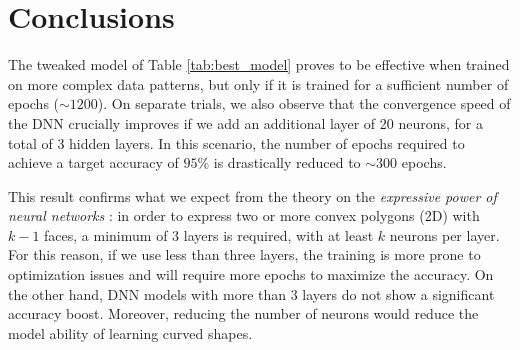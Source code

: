 \section{Conclusions}

The tweaked model of Table \ref{tab:best_model} proves to be effective when trained on more complex data patterns, but only if it is trained for a sufficient number of epochs ($\sim 1200$). On separate trials, we also observe that the convergence speed of the DNN crucially improves if we add an additional layer of 20 neurons, for a total of 3 hidden layers. In this scenario, the number of epochs required to achieve a target accuracy of $95\%$ is drastically reduced to $\sim 300$ epochs.

This result confirms what we expect from the theory on the \emph{expressive power of neural networks} \cite{MLbook}: in order to express two or more convex polygons (2D) with $k-1$ faces, a minimum of $3$ layers is required, with at least $k$ neurons per layer. For this reason, if we use less than three layers, the training is more prone to optimization issues and will require more epochs to maximize the accuracy. On the other hand, DNN models with more than 3 layers do not show a significant accuracy boost. Moreover, reducing the number of neurons would reduce the model ability of learning curved shapes.